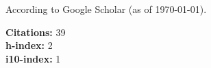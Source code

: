 \newif\ifshowpubsummary
\showpubsummarytrue %

\newif\ifshowsubmittedpubs

\newif\ifshowacceptedpubs

\nocite{*}
\ifshowpubsummary
    \begin{minipage}[t]{0.6\textwidth}
        According to Google Scholar (as of \today).
    \end{minipage}%
    \begin{minipage}[t]{0.4\textwidth}
        \begin{flushright}
            \textbf{Citations:} 39 \\
            \textbf{h-index:} 2    \\
            \textbf{i10-index:} 1
        \end{flushright}
    \end{minipage}

\else %
\fi

\ifshowsubmittedpubs
    \subsectiontitle{Submitted Publications}
    \printbibliography[keyword=submitted, heading=none]
\else %
\fi

\ifshowacceptedpubs
    \subsectiontitle{Accepted Publications}
    \printbibliography[keyword=accepted, heading=none]
\else %
\fi

\printbibliography[keyword=refereed, heading=none]
